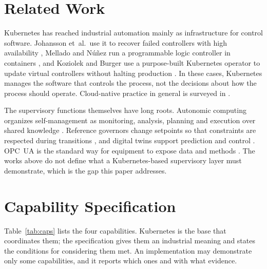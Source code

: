 \documentclass[conference]{IEEEtran}
\begin{document}
\section{Related Work}

Kubernetes has reached industrial automation mainly as infrastructure for control software. Johansson et~al.\ use it to recover failed controllers with high availability \cite{Johansson2022}, Mellado and Núñez run a programmable logic controller in containers \cite{Mellado2022}, and Koziolek and Burger use a purpose-built Kubernetes operator to update virtual controllers without halting production \cite{Koziolek2022}. In these cases, Kubernetes manages the software that controls the process, not the decisions about how the process should operate. Cloud-native practice in general is surveyed in \cite{Shuiguang2023}.

The supervisory functions themselves have long roots. Autonomic computing organizes self-management as monitoring, analysis, planning and execution over shared knowledge \cite{Kephart2003}. Reference governors change setpoints so that constraints are respected during transitions \cite{Gilbert1995,Garone2017}, and digital twins support prediction and control \cite{Kritzinger2018,Zhao2023}. OPC~UA is the standard way for equipment to expose data and methods \cite{IEC62541_1}. The works above do not define what a Kubernetes-based supervisory layer must demonstrate, which is the gap this paper addresses.

\section{Capability Specification}
\label{sec:spec}

Table~\ref{tab:caps} lists the four capabilities. Kubernetes is the base that coordinates them; the specification gives them an industrial meaning and states the conditions for considering them met. An implementation may demonstrate only some capabilities, and it reports which ones and with what evidence.
\end{document}
